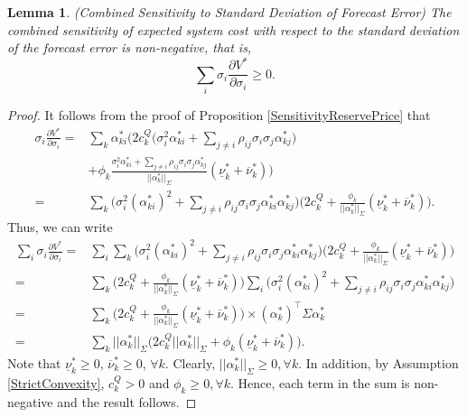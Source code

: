 \documentclass{article}
\newtheorem{lemma}{Lemma}
\begin{document}
\begin{lemma}\label{SensitivityTotalStandardDeviation}
(Combined Sensitivity to Standard Deviation of Forecast Error) The combined sensitivity of expected system cost with respect to the standard deviation of the forecast error is non-negative, that is, 
\begin{equation*}
\sum_i \sigma_i \frac{\partial V^*}{\partial \sigma_i} \ge 0.
\end{equation*}
\end{lemma}
\begin{proof}
It follows from the proof of Proposition \ref{SensitivityReservePrice} that
\begin{align*}
\sigma_i \frac{\partial V^*}{\partial \sigma_i} =& \sum_k\alpha_{ki}^*\Big(2c_k^Q\big(\sigma_i^2 \alpha_{ki}^* + \sum_{j \ne i} \rho_{ij} \sigma_i \sigma_j\alpha_{kj}^*\big)\\
&+ \phi_k \frac{\sigma_i^2 \alpha_{ki}^* + \sum_{j \ne i} \rho_{ij} \sigma_i \sigma_j \alpha_{kj}^*}{||\alpha_k^*||_{\Sigma}}(\underline{\nu}_k^* + \overline{\nu}_k^*)\Big)\\
=&  \sum_k\Big(\sigma_i^2 (\alpha_{ki}^*)^2 + \sum_{j \ne i} \rho_{ij} \sigma_i \sigma_j\alpha_{ki}^* \alpha_{kj}^*\Big)\Big(2c_k^Q + \frac{\phi_k}{||\alpha_k^*||_{\Sigma}}(\underline{\nu}_k^* + \overline{\nu}_k^*)\Big).
\end{align*}
Thus, we can write
\begin{align*}
\sum_i \sigma_i \frac{\partial V^*}{\partial \sigma_i} =& \sum_i \sum_k \Big(\sigma_i^2 (\alpha_{ki}^*)^2 + \sum_{j \ne i} \rho_{ij} \sigma_i \sigma_j\alpha_{ki}^* \alpha_{kj}^*\Big) \Big(2c_k^Q + \frac{\phi_k}{||\alpha_k^*||_{\Sigma}}(\underline{\nu}_k^* + \overline{\nu}_k^*)\Big)\\
=& \sum_k \Big(2c_k^Q + \frac{\phi_k}{||\alpha_k^*||_{\Sigma}}(\underline{\nu}_k^* + \overline{\nu}_k^*)\Big) \sum_i \Big(\sigma_i^2 (\alpha_{ki}^*)^2 + \sum_{j \ne i} \rho_{ij} \sigma_i \sigma_j\alpha_{ki}^* \alpha_{kj}^*\Big)\\
=& \sum_k \Big(2c_k^Q + \frac{\phi_k}{||\alpha_k^*||_{\Sigma}}(\underline{\nu}_k^* + \overline{\nu}_k^*)\Big) \times(\alpha_k^*)^\top \Sigma \alpha_k^*\\
=& \sum_k ||\alpha_k^*||_{\Sigma} \Big(2c_k^Q ||\alpha_k^*||_{\Sigma} + \phi_k (\underline{\nu}_k^* + \overline{\nu}_k^*)\Big).
\end{align*}
Note that $\underline{\nu}_k^* \ge 0$, $\overline{\nu}_k^* \ge 0$, $\forall k$. Clearly, $||\alpha_k^*||_{\Sigma} \ge 0, \forall k$. In addition, by Assumption \ref{StrictConvexity}, $c_k^Q > 0$ and $\phi_k \ge 0, \forall k$. Hence, each term in the sum is non-negative and the result follows.
\end{proof}
\end{document}
